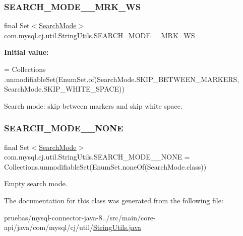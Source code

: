 \subsubsection{\texorpdfstring{S\+E\+A\+R\+C\+H\+\_\+\+M\+O\+D\+E\+\_\+\+\_\+\+M\+R\+K\+\_\+\+WS}{SEARCH\_MODE\_\_MRK\_WS}}
{\footnotesize\ttfamily final Set$<$\mbox{\hyperlink{enumcom_1_1mysql_1_1cj_1_1util_1_1_string_utils_1_1_search_mode}{Search\+Mode}}$>$ com.\+mysql.\+cj.\+util.\+String\+Utils.\+S\+E\+A\+R\+C\+H\+\_\+\+M\+O\+D\+E\+\_\+\+\_\+\+M\+R\+K\+\_\+\+WS\hspace{0.3cm}{\ttfamily [static]}}

{\bfseries Initial value\+:}
\begin{DoxyCode}
= Collections
            .unmodifiableSet(EnumSet.of(SearchMode.SKIP\_BETWEEN\_MARKERS, SearchMode.SKIP\_WHITE\_SPACE))
\end{DoxyCode}
Search mode\+: skip between markers and skip white space. \mbox{\label{classcom_1_1mysql_1_1cj_1_1util_1_1_string_utils_a96bd30b71e422236854638c4d47c8c63}} 
\subsubsection{\texorpdfstring{S\+E\+A\+R\+C\+H\+\_\+\+M\+O\+D\+E\+\_\+\+\_\+\+N\+O\+NE}{SEARCH\_MODE\_\_NONE}}
{\footnotesize\ttfamily final Set$<$\mbox{\hyperlink{enumcom_1_1mysql_1_1cj_1_1util_1_1_string_utils_1_1_search_mode}{Search\+Mode}}$>$ com.\+mysql.\+cj.\+util.\+String\+Utils.\+S\+E\+A\+R\+C\+H\+\_\+\+M\+O\+D\+E\+\_\+\+\_\+\+N\+O\+NE = Collections.\+unmodifiable\+Set(Enum\+Set.\+none\+Of(Search\+Mode.\+class))\hspace{0.3cm}{\ttfamily [static]}}

Empty search mode. 

The documentation for this class was generated from the following file\+:\begin{DoxyCompactItemize}
\item 
pruebas/mysql-\/connector-\/java-\/8../src/main/core-\/api/java/com/mysql/cj/util/\mbox{\hyperlink{_string_utils_8java}{String\+Utils.\+java}}\end{DoxyCompactItemize}

